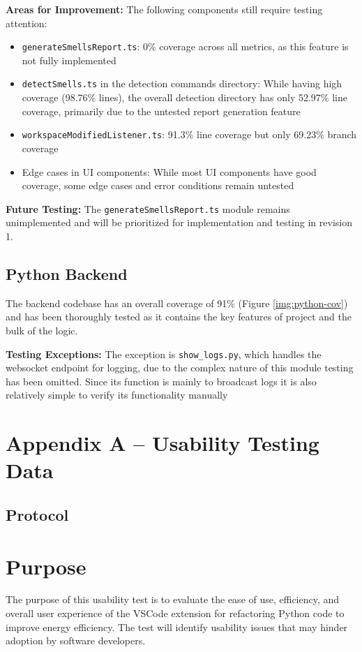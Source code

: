 \documentclass[12pt, titlepage]{article}
\begin{document}
\noindent \textbf{Areas for Improvement:} The following components still require testing attention:
\begin{itemize}
  \item \texttt{generateSmellsReport.ts}: 0\% coverage across all metrics, as this feature is not fully implemented
  \item \texttt{detectSmells.ts} in the detection commands directory: While having high coverage (98.76\% lines), the overall detection directory has only 52.97\% line coverage, primarily due to the untested report generation feature
  \item \texttt{workspaceModifiedListener.ts}: 91.3\% line coverage but only 69.23\% branch coverage
  \item Edge cases in UI components: While most UI components have good coverage, some edge cases and error conditions remain untested
\end{itemize}

\noindent \textbf{Future Testing:} The \texttt{generateSmellsReport.ts} module remains unimplemented and will be prioritized for implementation and testing in revision 1.

\subsection{Python Backend}
The backend codebase has an overall coverage of 91\% (Figure
\ref{img:python-cov}) and has been thoroughly tested as it contains
the key features of project and the bulk of the logic. 

\noindent \textbf{Testing Exceptions:} The exception
is \texttt{show\_logs.py}, which handles the websocket endpoint for
logging, due to the complex nature of this module testing has been
omitted. Since its function is mainly to broadcast logs it is also
relatively simple to verify its functionality manually\\

\newpage
\section*{Appendix A -- Usability Testing Data} \label{appendix:usability}

\subsection*{Protocol}

\section*{Purpose}
The purpose of this usability test is to evaluate the ease of use,
efficiency, and overall user experience of the VSCode extension for
refactoring Python code to improve energy efficiency. The test will
identify usability issues that may hinder adoption by software developers.
\end{document}
